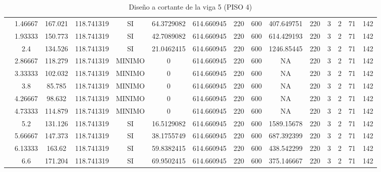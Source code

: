 \begin{table}[H]
{\begin{tabular}{|c|c|c|c|c|c|c|c|c|c|c|c|c|c|c|}
\cline{2-15}    & 1.46667 & 167.021 & 118.741319 & SI  & 64.3729082 & 614.660945 & 220 & 600 & 407.649751 & 220 & 3   & 2   & 71  & 142 \bigstrut\\
\cline{2-15}    & 1.93333 & 150.773 & 118.741319 & SI  & 42.7089082 & 614.660945 & 220 & 600 & 614.429193 & 220 & 3   & 2   & 71  & 142 \bigstrut\\
\cline{2-15}    & 2.4 & 134.526 & 118.741319 & SI  & 21.0462415 & 614.660945 & 220 & 600 & 1246.85445 & 220 & 3   & 2   & 71  & 142 \bigstrut\\
\cline{2-15}    & 2.86667 & 118.279 & 118.741319 & MINIMO & 0   & 614.660945 & 220 & 600 & NA  & 220 & 3   & 2   & 71  & 142 \bigstrut\\
\cline{2-15}    & 3.33333 & 102.032 & 118.741319 & MINIMO & 0   & 614.660945 & 220 & 600 & NA  & 220 & 3   & 2   & 71  & 142 \bigstrut\\
\cline{2-15}    & 3.8 & 85.785 & 118.741319 & MINIMO & 0   & 614.660945 & 220 & 600 & NA  & 220 & 3   & 2   & 71  & 142 \bigstrut\\
\cline{2-15}    & 4.26667 & 98.632 & 118.741319 & MINIMO & 0   & 614.660945 & 220 & 600 & NA  & 220 & 3   & 2   & 71  & 142 \bigstrut\\
\cline{2-15}    & 4.73333 & 114.879 & 118.741319 & MINIMO & 0   & 614.660945 & 220 & 600 & NA  & 220 & 3   & 2   & 71  & 142 \bigstrut\\
\cline{2-15}    & 5.2 & 131.126 & 118.741319 & SI  & 16.5129082 & 614.660945 & 220 & 600 & 1589.15678 & 220 & 3   & 2   & 71  & 142 \bigstrut\\
\cline{2-15}    & 5.66667 & 147.373 & 118.741319 & SI  & 38.1755749 & 614.660945 & 220 & 600 & 687.392399 & 220 & 3   & 2   & 71  & 142 \bigstrut\\
\cline{2-15}    & 6.13333 & 163.62 & 118.741319 & SI  & 59.8382415 & 614.660945 & 220 & 600 & 438.542299 & 220 & 3   & 2   & 71  & 142 \bigstrut\\
\cline{2-15}    & 6.6 & 171.204 & 118.741319 & SI  & 69.9502415 & 614.660945 & 220 & 600 & 375.146667 & 220 & 3   & 2   & 71  & 142 \bigstrut\\
\hline
\end{tabular}%

  
 
  }%
    \caption{Diseño a cortante de la viga 5 (PISO 4) }
  \label{tab:C VG5 P4 }%
\end{table}%

